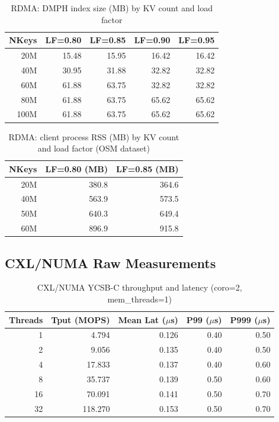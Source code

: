 \documentclass[conference]{IEEEtran}
\begin{document}
\begin{table}[H]
\centering
\caption{RDMA: DMPH index size (MB) by KV count and load factor}
\label{tab:rdma-dmph}
\scriptsize
\begin{tabular}{@{}rrrrr@{}}
\toprule
\textbf{NKeys} & \textbf{LF=0.80} & \textbf{LF=0.85} & \textbf{LF=0.90} & \textbf{LF=0.95} \\
\midrule
20M  & 15.48 & 15.95 & 16.42 & 16.42 \\
40M  & 30.95 & 31.88 & 32.82 & 32.82 \\
60M  & 61.88 & 63.75 & 32.82 & 32.82 \\
80M  & 61.88 & 63.75 & 65.62 & 65.62 \\
100M & 61.88 & 63.75 & 65.62 & 65.62 \\
\bottomrule
\end{tabular}
\end{table}

\begin{table}[H]
\centering
\caption{RDMA: client process RSS (MB) by KV count and load factor (OSM dataset)}
\label{tab:rdma-rss}
\scriptsize
\begin{tabular}{@{}rrr@{}}
\toprule
\textbf{NKeys} & \textbf{LF=0.80 (MB)} & \textbf{LF=0.85 (MB)} \\
\midrule
20M  & 380.8 & 364.6 \\
40M  & 563.9 & 573.5 \\
50M  & 640.3 & 649.4 \\
60M  & 896.9 & 915.8 \\
\bottomrule
\end{tabular}
\end{table}

\subsection*{CXL/NUMA Raw Measurements}

\begin{table}[H]
\centering
\caption{CXL/NUMA YCSB-C throughput and latency (coro=2, mem\_threads=1)}
\label{tab:numa-ycsbc}
\scriptsize
\begin{tabular}{@{}rrrrr@{}}
\toprule
\textbf{Threads} & \textbf{Tput (MOPS)} & \textbf{Mean Lat ($\mu$s)} & \textbf{P99 ($\mu$s)} & \textbf{P999 ($\mu$s)} \\
\midrule
1  & 4.794  & 0.126 & 0.40 & 0.50 \\
2  & 9.056  & 0.135 & 0.40 & 0.50 \\
4  & 17.833 & 0.137 & 0.40 & 0.60 \\
8  & 35.737 & 0.139 & 0.50 & 0.60 \\
16 & 70.091 & 0.141 & 0.50 & 0.70 \\
32 & 118.270 & 0.153 & 0.50 & 0.70 \\
\bottomrule
\end{tabular}
\end{table}
\end{document}
